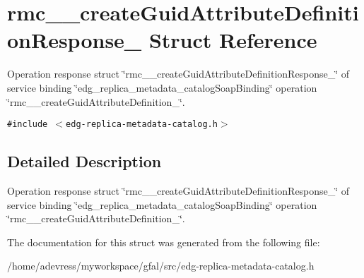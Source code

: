 \section{rmc\_\-\_\-create\-Guid\-Attribute\-Definition\-Response\_\- Struct Reference}
\label{structrmc____createGuidAttributeDefinitionResponse__}
Operation response struct \char`\"{}rmc\_\-\_\-create\-Guid\-Attribute\-Definition\-Response\_\-\char`\"{} of service binding \char`\"{}edg\_\-replica\_\-metadata\_\-catalog\-Soap\-Binding\char`\"{} operation \char`\"{}rmc\_\-\_\-create\-Guid\-Attribute\-Definition\_\-\char`\"{}.  


{\tt \#include $<$edg-replica-metadata-catalog.h$>$}



\subsection{Detailed Description}
Operation response struct \char`\"{}rmc\_\-\_\-create\-Guid\-Attribute\-Definition\-Response\_\-\char`\"{} of service binding \char`\"{}edg\_\-replica\_\-metadata\_\-catalog\-Soap\-Binding\char`\"{} operation \char`\"{}rmc\_\-\_\-create\-Guid\-Attribute\-Definition\_\-\char`\"{}. 



The documentation for this struct was generated from the following file:\begin{CompactItemize}
\item 
/home/adevress/myworkspace/gfal/src/edg-replica-metadata-catalog.h\end{CompactItemize}
